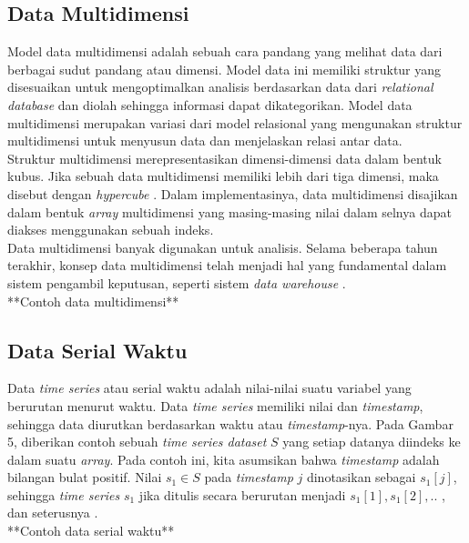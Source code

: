 \subsection{Data Multidimensi}
\tab Model data multidimensi adalah sebuah cara pandang yang melihat data dari berbagai sudut pandang atau dimensi. Model data ini memiliki struktur yang disesuaikan untuk mengoptimalkan analisis berdasarkan data dari \textit{relational database} dan diolah sehingga informasi dapat dikategorikan. Model data multidimensi merupakan variasi dari model relasional yang mengunakan struktur multidimensi untuk menyusun data dan menjelaskan relasi antar data.\\
\tab Struktur multidimensi merepresentasikan dimensi-dimensi data dalam bentuk kubus. Jika sebuah data multidimensi memiliki lebih dari tiga dimensi, maka disebut dengan \textit{hypercube} \cite{multidimensional-database}. Dalam implementasinya, data multidimensi disajikan dalam bentuk \textit{array} multidimensi yang masing-masing nilai dalam selnya dapat diakses menggunakan sebuah indeks.\\
\tab Data multidimensi banyak digunakan untuk analisis. Selama beberapa tahun terakhir, konsep data multidimensi telah menjadi hal yang fundamental dalam sistem pengambil keputusan, seperti sistem \textit{data warehouse} \cite{multidimensional-database}.\\

**Contoh data multidimensi**

\subsection{Data Serial Waktu}
\tab Data \textit{time series} atau serial waktu adalah nilai-nilai suatu variabel yang berurutan menurut waktu. Data \textit{time series} memiliki nilai dan \textit{timestamp}, sehingga data diurutkan berdasarkan waktu atau \textit{timestamp}-nya. Pada Gambar 5, diberikan contoh sebuah \textit{time series dataset} $S$ yang setiap datanya diindeks ke dalam suatu \textit{array}. Pada contoh ini, kita asumsikan bahwa \textit{timestamp} adalah bilangan bulat positif. Nilai $s_1 \in S$ pada \textit{timestamp} $j$ dinotasikan sebagai $s_1[j]$, sehingga \textit{time series} $s_1$ jika ditulis secara berurutan menjadi $s_1[1], s_1[2],..$ , dan seterusnya \cite{time-series}.\\

**Contoh data serial waktu**

